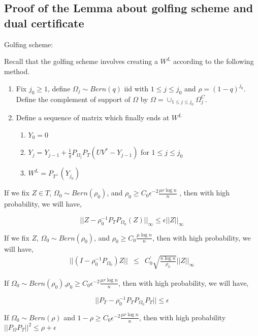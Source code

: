 \subsection{Proof of the Lemma about golfing scheme and dual certificate }

Golfing scheme:

Recall that the golfing scheme involves creating a $W^{L}$ according to the following method. 
\begin{enumerate}
\item Fix $j_{0}\ge1$, define $\Omega_{j}\sim Bern(q)$ iid with $1\le j\le j_{0}$ and $\rho=(1-q)^{j_{0}}$. Define the complement of support of $\Omega$ by $\Omega=\cup_{1\le j\le j_{0}}\Omega_{j}^{C}$. 
\item Define a sequence of matrix which finally ends at $W^{L}$

\begin{enumerate}
\item $Y_{0}=0$
\item $Y_{j}=Y_{j-1}+\frac{1}{q}P_{\Omega_{j}}P_{T}(UV^{*}-Y_{j-1})$ for $1\le j\le j_{0}$
\item $W^{L}=P_{\ensuremath{T^{\bot}}}(Y_{j_{0}})$
\end{enumerate}

\end{enumerate}


\begin{fact}
\label{fact2}
If we fix $Z\in T$, $\Omega_{0}\sim Bern(\rho_{0})$, and $\rho_{0}\ge C_{0}\epsilon^{-2}\frac{\mu r\log n}{n}$ , then with high probability, we will have, 

\label{fact5}
\[
||Z-\rho_{0}^{-1}P_{T}P_{\Omega_{0}}(Z)||_{\infty}\le\epsilon||Z||_{\infty}
\]

\begin{fact}
\label{fact3}
If we fix $Z$, $\Omega_{0}\sim Bern(\rho_{0})$, and $\rho_{0}\ge C_{0}\frac{\mu\log n}{n}$, then with high probability,
we will have, 
\begin{eqnarray*}
||(I-\rho_{0}^{-1}P_{\Omega_{0}})Z|| & \le & C_{0}^{'}\sqrt{\frac{n\log n}{\rho_{0}}}||Z||_{\infty}
\end{eqnarray*}

\begin{fact}
\label{fact4}
If $\Omega_{0}\sim Bern(\rho_{0})$,$\rho_{0}\ge C_{0}\epsilon^{-2}\frac{\mu r\log n}{n}$, then with high probability, we will have, 

\[
||P_{T}-\rho_{0}^{-1}P_{T}P_{\Omega_{0}}P_{T}||\le\epsilon
\]

\begin{fact}
If $\Omega_{0}\sim Bern(\rho)$ and $1-\rho\ge C_{0}\epsilon^{-2}\frac{\mu r\log n}{n}$, then with high probability $||P_{\Omega}P_{T}||^{2}\le\rho+\epsilon$ 
\end{fact}
\end{fact}
\end{fact}
\end{fact}


